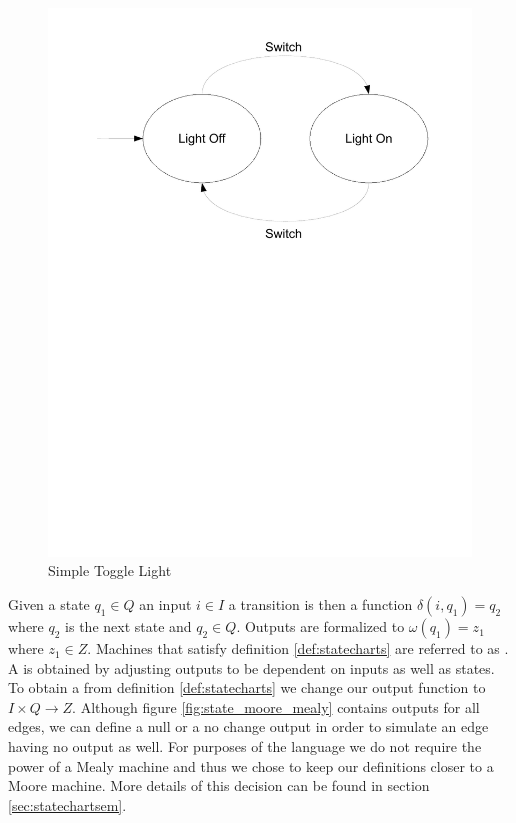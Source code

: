 \begin{figure}[htp]
    \centering
    \includegraphics[trim= 10mm 150mm 10mm 10mm, clip, width=\imgmedium]{./images/state_blink_light.pdf}
    \caption{Simple Toggle Light}
    \label{fig:state_blink_light}
\end{figure}

Given a state $q_1 \in Q$ an input $i \in I$ a transition is then a function $\delta(i,q_1) = q_2$ where $q_2$ is the next state and $q_2 \in Q$.  Outputs are formalized to $\omega(q_1)=z_1$ where $z_1 \in Z$. Machines that satisfy definition \ref{def:statecharts} are referred to as  \cite{booth}. A  is obtained by adjusting outputs to be dependent on inputs as well as states. To obtain a  from definition \ref{def:statecharts} we change our output function to $I \times Q \rightarrow Z$. Although figure \ref{fig:state_moore_mealy} contains outputs for all edges, we can define a null or a no change output in order to simulate an edge having no output as well. For purposes of the \plccharts language we do not require the power of a Mealy machine and thus we chose to keep our definitions closer to a Moore machine. More details of this decision can be found in section \ref{sec:statechartsem}.

